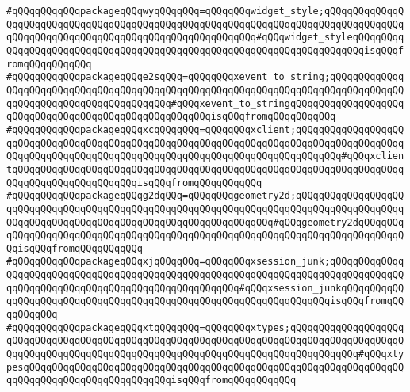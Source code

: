\verb|#qQQqqQQqqQQqpackageqQQqwyqQQqqQQq=qQQqqQQqwidget_style;qQQqqQQqqQQqqQQqqQQqqQQqqQQqqQQqqQQqqQQqqQQqqQQqqQQqqQQqqQQqqQQqqQQqqQQqqQQqqQQqqQQqqQQqqQQqqQQqqQQqqQQqqQQqqQQqqQQqqQQqqQQqqQQq#qQQqwidget_styleqQQqqQQqqQQqqQQqqQQqqQQqqQQqqQQqqQQqqQQqqQQqqQQqqQQqqQQqqQQqqQQqqQQqqQQqisqQQqfromqQQqqQQqqQQq|\newline
\verb|#qQQqqQQqqQQqpackageqQQqe2sqQQq=qQQqqQQqxevent_to_string;qQQqqQQqqQQqqQQqqQQqqQQqqQQqqQQqqQQqqQQqqQQqqQQqqQQqqQQqqQQqqQQqqQQqqQQqqQQqqQQqqQQqqQQqqQQqqQQqqQQqqQQqqQQqqQQq#qQQqxevent_to_stringqQQqqQQqqQQqqQQqqQQqqQQqqQQqqQQqqQQqqQQqqQQqqQQqqQQqqQQqisqQQqfromqQQqqQQqqQQq|\newline
\verb|#qQQqqQQqqQQqpackageqQQqxcqQQqqQQq=qQQqqQQqxclient;qQQqqQQqqQQqqQQqqQQqqQQqqQQqqQQqqQQqqQQqqQQqqQQqqQQqqQQqqQQqqQQqqQQqqQQqqQQqqQQqqQQqqQQqqQQqqQQqqQQqqQQqqQQqqQQqqQQqqQQqqQQqqQQqqQQqqQQqqQQqqQQqqQQq#qQQqxclientqQQqqQQqqQQqqQQqqQQqqQQqqQQqqQQqqQQqqQQqqQQqqQQqqQQqqQQqqQQqqQQqqQQqqQQqqQQqqQQqqQQqqQQqqQQqisqQQqfromqQQqqQQqqQQq|\newline
\verb|#qQQqqQQqqQQqpackageqQQqg2dqQQq=qQQqqQQqgeometry2d;qQQqqQQqqQQqqQQqqQQqqQQqqQQqqQQqqQQqqQQqqQQqqQQqqQQqqQQqqQQqqQQqqQQqqQQqqQQqqQQqqQQqqQQqqQQqqQQqqQQqqQQqqQQqqQQqqQQqqQQqqQQqqQQqqQQqqQQq#qQQqgeometry2dqQQqqQQqqQQqqQQqqQQqqQQqqQQqqQQqqQQqqQQqqQQqqQQqqQQqqQQqqQQqqQQqqQQqqQQqqQQqqQQqisqQQqfromqQQqqQQqqQQq|\newline
\verb|#qQQqqQQqqQQqpackageqQQqxjqQQqqQQq=qQQqqQQqxsession_junk;qQQqqQQqqQQqqQQqqQQqqQQqqQQqqQQqqQQqqQQqqQQqqQQqqQQqqQQqqQQqqQQqqQQqqQQqqQQqqQQqqQQqqQQqqQQqqQQqqQQqqQQqqQQqqQQqqQQqqQQqqQQq#qQQqxsession_junkqQQqqQQqqQQqqQQqqQQqqQQqqQQqqQQqqQQqqQQqqQQqqQQqqQQqqQQqqQQqqQQqqQQqisqQQqfromqQQqqQQqqQQq|\newline
\verb|#qQQqqQQqqQQqpackageqQQqxtqQQqqQQq=qQQqqQQqxtypes;qQQqqQQqqQQqqQQqqQQqqQQqqQQqqQQqqQQqqQQqqQQqqQQqqQQqqQQqqQQqqQQqqQQqqQQqqQQqqQQqqQQqqQQqqQQqqQQqqQQqqQQqqQQqqQQqqQQqqQQqqQQqqQQqqQQqqQQqqQQqqQQqqQQqqQQq#qQQqxtypesqQQqqQQqqQQqqQQqqQQqqQQqqQQqqQQqqQQqqQQqqQQqqQQqqQQqqQQqqQQqqQQqqQQqqQQqqQQqqQQqqQQqqQQqqQQqqQQqisqQQqfromqQQqqQQqqQQq|\newline
